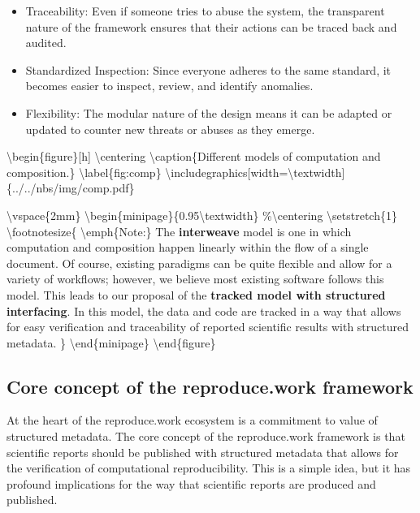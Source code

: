\begin{itemize}
\itemsep -0.2em
\item Traceability: Even if someone tries to abuse the system, the transparent nature of the framework ensures that their actions can be traced back and audited.
\item Standardized Inspection: Since everyone adheres to the same standard, it becomes easier to inspect, review, and identify anomalies.
\item Flexibility: The modular nature of the design means it can be adapted or updated to counter new threats or abuses as they emerge.
\end{itemize}

\textbackslash{}begin\{figure\}[h]
\textbackslash{}centering
\textbackslash{}caption\{Different models of computation and composition.\}
\textbackslash{}label\{fig:comp\}
\textbackslash{}includegraphics[width=\textbackslash{}textwidth]\{../../nbs/img/comp.pdf\}

\textbackslash{}vspace\{2mm\}
\textbackslash{}begin\{minipage\}\{0.95\textbackslash{}textwidth\}
\%\textbackslash{}centering
\textbackslash{}setstretch\{1\}
\textbackslash{}footnotesize\{
\textbackslash{}emph\{Note:\} The \textbf{interweave} model is one in which computation and composition happen linearly within the flow of a single document. Of course, existing paradigms can be quite flexible and allow for a variety of workflows; however, we believe most existing software follows this model. This leads to our proposal of the \textbf{tracked model with structured interfacing}. In this model, the data and code are tracked in a way that allows for easy verification and traceability of reported scientific results with structured metadata.
\}
\textbackslash{}end\{minipage\}
\textbackslash{}end\{figure\}

\hypertarget{core-concept-of-the-reproduce.work-framework}{%
\subsection{Core concept of the reproduce.work framework}\label{core-concept-of-the-reproduce.work-framework}}

At the heart of the reproduce.work ecosystem is a commitment to value of structured metadata. The core concept of the reproduce.work framework is that scientific reports should be published with structured metadata that allows for the verification of computational reproducibility. This is a simple idea, but it has profound implications for the way that scientific reports are produced and published.

